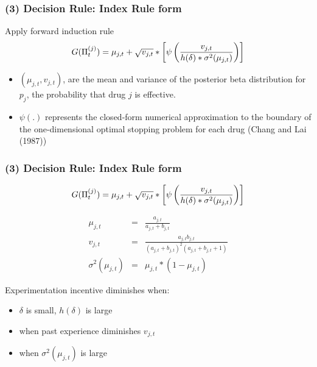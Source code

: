 \documentclass[aspectratio=169,11pt]{beamer}
\begin{document}
\begin{frame}[label=RULE]

\frametitle{(3) Decision Rule: Index Rule form}
\small

Apply forward induction rule 
\[
G(\Pi _{t}^{(j)})=\mu _{j,t}+\sqrt{v_{j,t}}*\left[\psi \left( \frac{v_{j,t}}{%
h(\delta)\ast \sigma ^{2}(\mu _{j,t})}\right)\right]
\]

\begin{itemize}
\item $(\mu _{j,t},v_{j,t})$, are the mean and variance of the posterior
beta distribution for $p_{j}$, the probability that drug $j$ is effective.

\item $\psi(.)$ represents the closed-form numerical approximation to the
boundary of the one-dimensional optimal stopping problem for each drug
(Chang and Lai (1987))
\end{itemize}
\end{frame}


\begin{frame}
\frametitle{(3) Decision Rule: Index Rule form}

\[
G(\Pi _{t}^{(j)})=\mu _{j,t}+\sqrt{v_{j,t}}*\left[\psi \left( \frac{v_{j,t}}{%
h(\delta)\ast \sigma ^{2}(\mu _{j,t})}\right)\right]
\]

\begin{eqnarray*}
\mu _{j,t} &=&\frac{a_{j,t}}{a_{j,t}+b_{j,t}} \\
v_{j,t} &=&\frac{a_{j,t}b_{j,t}}{(a_{j,t}+b_{j,t})^{2}(a_{j,t}+b_{j,t}+1)} \\
\sigma ^{2}(\mu _{j,t}) &=&\mu _{j,t}\ast (1-\mu _{j,t})
\end{eqnarray*}

Experimentation incentive diminishes when:

\begin{itemize}
\item $\delta $ is small, $h(\delta)$ is large

\item when past experience diminishes $v_{j,t}$

\item when $\sigma ^{2}(\mu _{j,t})$ is large
\end{itemize}
\end{frame}

\end{document}
